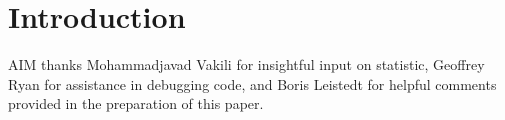\documentclass[preprint]{aastex}
\begin{document}
\begin{abstract}

\end{abstract}


\section{Introduction}



\label{sec:intro}


\begin{acknowledgements}
AIM thanks Mohammadjavad Vakili for insightful input on statistic, Geoffrey Ryan for assistance in debugging code, and Boris Leistedt for helpful comments provided in the preparation of this paper.
\end{acknowledgements}

%
%
\end{document}
